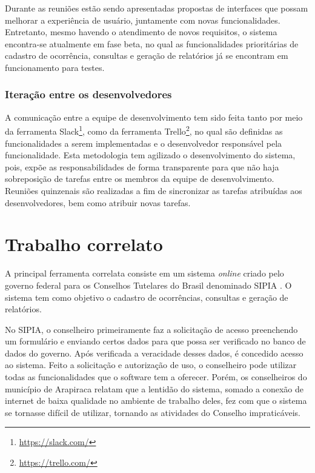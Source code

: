 \documentclass[12pt]{article}
\begin{document}
Durante as reuniões estão sendo apresentadas propostas de interfaces que possam melhorar a experiência de usuário, juntamente com novas funcionalidades. Entretanto, mesmo havendo o atendimento de novos requisitos, o sistema encontra-se atualmente em fase beta, no qual as funcionalidades prioritárias de cadastro de ocorrência, consultas e geração de relatórios já se encontram em funcionamento para testes.

\subsubsection*{Iteração entre os desenvolvedores}
A comunicação entre a equipe de desenvolvimento tem sido feita tanto por meio da ferramenta Slack\footnote{\url{https://slack.com/}}, como da ferramenta Trello\footnote{\url{https://trello.com/}}, no qual são definidas as funcionalidades a serem implementadas e o desenvolvedor responsável pela funcionalidade. Esta metodologia tem agilizado o desenvolvimento do sistema, pois, expõe as responsabilidades de forma transparente para que não haja sobreposição de tarefas entre os membros da equipe de desenvolvimento. Reuniões quinzenais são realizadas a fim de sincronizar as tarefas atribuídas aos desenvolvedores, bem como atribuir novas tarefas. 

\section{Trabalho correlato}

A principal ferramenta correlata consiste em um sistema \textit{online} criado pelo governo federal para os Conselhos Tutelares do Brasil denominado SIPIA \cite{Sipia}. O sistema tem como objetivo o cadastro de ocorrências, consultas e geração de relatórios.

No SIPIA, o conselheiro primeiramente faz a solicitação de acesso preenchendo um formulário e enviando certos dados para que possa ser verificado no banco de dados do governo. Após verificada a veracidade desses dados, é concedido acesso ao sistema. Feito a solicitação e autorização de uso, o conselheiro pode utilizar todas as funcionalidades que o software tem a oferecer. Porém, os conselheiros do município de Arapiraca relatam que a lentidão do sistema, somado a conexão de internet de baixa qualidade no ambiente de trabalho deles, fez com que o sistema se tornasse difícil de utilizar, tornando as atividades do Conselho impraticáveis.
\end{document}
